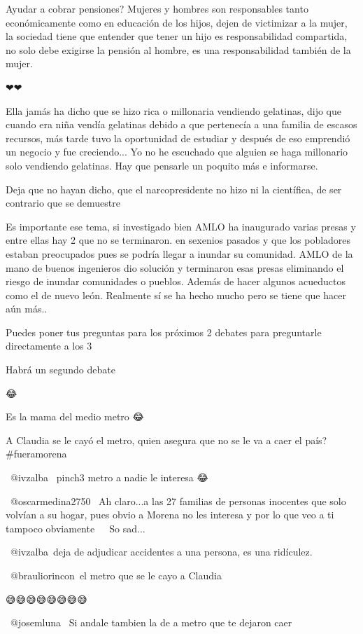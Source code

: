Ayudar a cobrar pensiones? Mujeres y hombres son responsables tanto económicamente como en educación de los hijos, dejen de victimizar a la mujer, la sociedad tiene que entender que tener un hijo es responsabilidad compartida, no solo debe exigirse la pensión al hombre, es una responsabilidad también de la mujer.

❤❤

Ella jamás ha dicho que se hizo rica o millonaria vendiendo gelatinas, dijo que cuando era niña vendía gelatinas debido a que pertenecía a una familia de escasos recursos, más tarde tuvo la oportunidad de estudiar y después de eso emprendió un negocio y fue creciendo... Yo no he escuchado que alguien se haga millonario solo vendiendo gelatinas. Hay que pensarle un poquito más e informarse.

Deja que no hayan dicho, que el narcopresidente no hizo ni la científica, de ser contrario que se demuestre

Es importante ese tema, si investigado bien AMLO ha inaugurado varias presas y entre ellas hay 2 que no se terminaron. en sexenios pasados y que los pobladores estaban preocupados pues se podría llegar a inundar su comunidad. AMLO de la mano de buenos ingenieros dio solución y terminaron esas presas eliminando el riesgo de inundar comunidades o pueblos. Además de hacer algunos acueductos como el de nuevo león. Realmente sí se ha hecho mucho pero se tiene que hacer aún más..

Puedes poner tus preguntas para los próximos 2 debates para preguntarle directamente a los 3

Habrá un segundo debate

😂

Es la mama del medio metro 😂

A Claudia se le cayó el metro, quien asegura que no se le va a caer el país? 🤷🏻‍♀️
#fueramorena

​ @ivzalba  pinch3 metro a nadie le interesa 😂

 @oscarmedina2750  Ah claro...a las 27 familias de personas inocentes que solo volvían a su hogar, pues obvio a Morena no les interesa y por lo que veo a ti tampoco obviamente 🤷🏻‍♀️ So sad...

​ @ivzalba deja de adjudicar accidentes a una persona, es una ridículez.

​ @brauliorincon el metro que se le cayo a Claudia

😅😅😅😅😅😅😅😅

 @josemluna  Si andale tambien la de a metro que te dejaron caer

